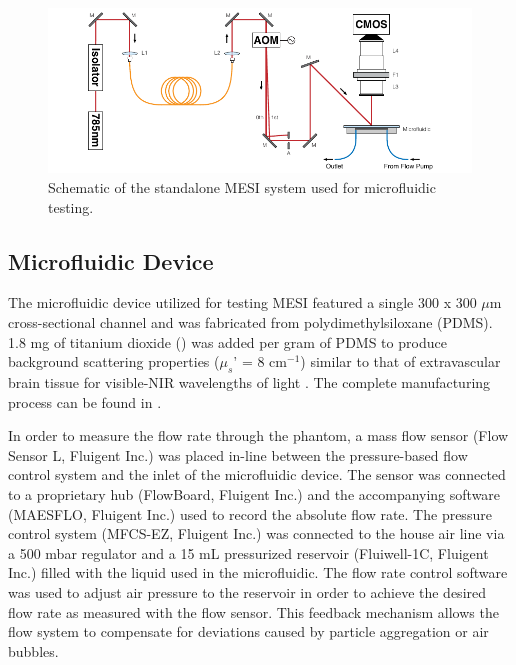 \begin{figure}
    \includegraphics{figures/chapter_4/standaloneschematic.pdf}
    \caption{
        \label{fig:standaloneschematic}
        Schematic of the standalone MESI system used for microfluidic testing.
    }
\end{figure}

\subsection{Microfluidic Device}

The microfluidic device utilized for testing MESI featured a single 300 x 300 $\mu$m cross-sectional channel and was fabricated from polydimethylsiloxane (PDMS). 1.8 mg of titanium dioxide () was added per gram of PDMS to produce background scattering properties ($\mu_s$' = 8 cm$^{-1}$)\cite{Parthasarathy:2008el} similar to that of extravascular brain tissue for visible-NIR wavelengths of light \cite{Yaroslavsky:2002tg}. The complete manufacturing process can be found in \cite{Richards:2016hy}.

In order to measure the flow rate through the phantom, a mass flow sensor (Flow Sensor L, Fluigent Inc.) was placed in-line between the pressure-based flow control system and the inlet of the microfluidic device. The sensor was connected to a proprietary hub (FlowBoard, Fluigent Inc.) and the accompanying software (MAESFLO, Fluigent Inc.) used to record the absolute flow rate. The pressure control system (MFCS-EZ, Fluigent Inc.) was connected to the house air line via a 500 mbar regulator and a 15 mL pressurized reservoir (Fluiwell-1C, Fluigent Inc.) filled with the liquid used in the microfluidic. The flow rate control software was used to adjust air pressure to the reservoir in order to achieve the desired flow rate as measured with the flow sensor. This feedback mechanism allows the flow system to compensate for deviations caused by particle aggregation or air bubbles.

